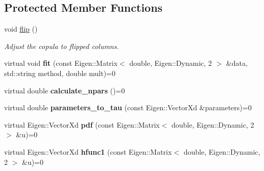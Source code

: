 \subsection*{Protected Member Functions}
\begin{DoxyCompactItemize}
\item 
void \hyperlink{classvinecopulib_1_1_abstract_bicop_a4e62970bb8e533f97f66c280c1a908cf}{flip} ()\hypertarget{classvinecopulib_1_1_abstract_bicop_a4e62970bb8e533f97f66c280c1a908cf}{}\label{classvinecopulib_1_1_abstract_bicop_a4e62970bb8e533f97f66c280c1a908cf}

\begin{DoxyCompactList}\small\item\em Adjust the copula to flipped columns. \end{DoxyCompactList}\item 
virtual void {\bfseries fit} (const Eigen\+::\+Matrix$<$ double, Eigen\+::\+Dynamic, 2 $>$ \&data, std\+::string method, double mult)=0\hypertarget{classvinecopulib_1_1_abstract_bicop_a9cce328189e4637ef86e11fbf4e12a4a}{}\label{classvinecopulib_1_1_abstract_bicop_a9cce328189e4637ef86e11fbf4e12a4a}

\item 
virtual double {\bfseries calculate\+\_\+npars} ()=0\hypertarget{classvinecopulib_1_1_abstract_bicop_af460c2a5a6d2743080b3a883182cd78e}{}\label{classvinecopulib_1_1_abstract_bicop_af460c2a5a6d2743080b3a883182cd78e}

\item 
virtual double {\bfseries parameters\+\_\+to\+\_\+tau} (const Eigen\+::\+Vector\+Xd \&parameters)=0\hypertarget{classvinecopulib_1_1_abstract_bicop_a71ba68887d581483bd51697885dc2d8c}{}\label{classvinecopulib_1_1_abstract_bicop_a71ba68887d581483bd51697885dc2d8c}

\item 
virtual Eigen\+::\+Vector\+Xd {\bfseries pdf} (const Eigen\+::\+Matrix$<$ double, Eigen\+::\+Dynamic, 2 $>$ \&u)=0\hypertarget{classvinecopulib_1_1_abstract_bicop_a4594c3b99a7f2d949a52bf177b1651c3}{}\label{classvinecopulib_1_1_abstract_bicop_a4594c3b99a7f2d949a52bf177b1651c3}

\item 
virtual Eigen\+::\+Vector\+Xd {\bfseries hfunc1} (const Eigen\+::\+Matrix$<$ double, Eigen\+::\+Dynamic, 2 $>$ \&u)=0\hypertarget{classvinecopulib_1_1_abstract_bicop_a2dece0c5a4690e18e8407ea9078522fd}{}\label{classvinecopulib_1_1_abstract_bicop_a2dece0c5a4690e18e8407ea9078522fd}


\end{DoxyCompactItemize}

